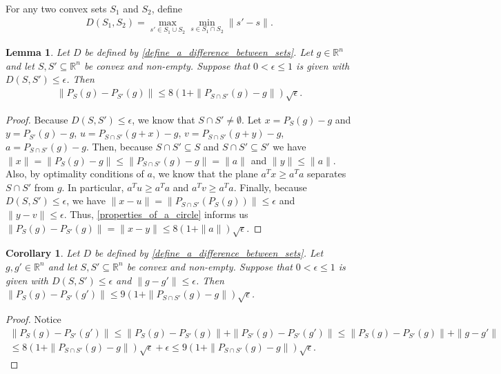 \documentclass{article}
\newtheorem{corollary}[theorem]{Corollary}
\newtheorem{lemma}[theorem]{Lemma}
\theoremstyle{case}
\numberwithin{theorem}{subsection}
\newcommand{\Rn}{\mathbb R^n}
\newcommand{\convexdistance}{{D}}
\begin{document}
For any two convex sets $S_1$ and $S_2$, define
\begin{align}
\convexdistance\left(S_1, S_2\right) = \max_{s' \in S_1 \cup S_2} \min_{s \in S_1 \cap S_2} \|s' - s\|. \label{define_a_difference_between_sets}
\end{align}

\begin{lemma}
\label{board_tied_to_sphere}
Let $\convexdistance$ be defined by \cref{define_a_difference_between_sets}.
Let $g \in \Rn$ and let $S, S' \subseteq \Rn$ be convex and non-empty.
Suppose that $0 < \epsilon \le 1$ is given with $D\left(S, S'\right) \le \epsilon$.
Then 
\begin{align*}
\|P_{S}(g) - P_{S'}(g)\| \le 8\left(1 + \|P_{S \cap S'}(g) - g\|\right) \sqrt{\epsilon}.
\end{align*}
\end{lemma}
\begin{proof}
Because $\convexdistance(S, S') \le \epsilon$, we know that $S \cap S' \ne \emptyset$.
Let $x = P_S(g) - g$ and $y = P_{S'}(g) - g$, $u = P_{S \cap S'}(g + x) - g$, $v = P_{S \cap S'}(g + y) - g$, $a = P_{S \cap S'}(g) - g$.
Then, because $S \cap S' \subseteq S$ and $S \cap S' \subseteq S'$ we have
$\|x\| = \|P_S(g) - g\| \le \|P_{S \cap S'} (g) - g\| = \|a\|$ and $\|y\| \le \|a\|$.
Also, by optimality conditions of $a$, we know that the plane $a^Tx \ge a^Ta$ separates $S \cap S'$ from $g$.
In particular, $a^Tu \ge a^Ta$ and $a^Tv \ge a^Ta$.
Finally, because $\convexdistance(S, S') \le \epsilon$, we have $\|x - u\| = \|P_{S \cap S'}\left(P_S(g)\right)\| \le \epsilon$ and $\|y - v\| \le \epsilon$.
Thus, \cref{properties_of_a_circle} informs us
$\|P_S(g) - P_{S'}(g)\| = \|x - y\| \le 8(1 + \|a\|) \sqrt{\epsilon}$.
\end{proof}


\begin{corollary}
Let $\convexdistance$ be defined by \cref{define_a_difference_between_sets}.
Let $g, g' \in \Rn$ and let $S, S' \subseteq \Rn$ be convex and non-empty.
Suppose that $0 < \epsilon \le 1$ is given with $D\left(S, S'\right) \le \epsilon$ and $\|g - g'\| \le \epsilon$.
Then $\|P_S(g) - P_{S'}(g')\| \le 9\left(1 + \|P_{S \cap S'}(g) - g\|\right) \sqrt{\epsilon}$.
\end{corollary}
\begin{proof}
Notice
\begin{align*}
\|P_S(g) - P_{S'}(g')\| 
\le \|P_S(g) - P_{S'}(g)\| + \|P_{S'}(g) - P_{S'}(g')\| 
\le \|P_S(g) - P_{S'}(g)\| + \|g - g'\| \\
\le 8\left(1 + \|P_{S \cap S'}(g) - g\|\right) \sqrt{\epsilon} + \epsilon
\le 9\left(1 + \|P_{S \cap S'}(g) - g\|\right) \sqrt{\epsilon}.
\end{align*}
\end{proof}
\end{document}
